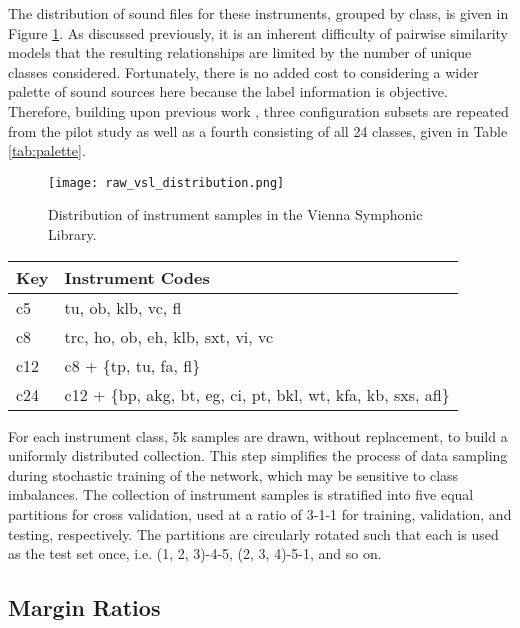 The distribution of sound files for these instruments, grouped by class, is given in Figure \ref{fig:c24_dist}.
As discussed previously, it is an inherent difficulty of pairwise similarity models that the resulting relationships are limited by the number of unique classes considered.
Fortunately, there is no added cost to considering a wider palette of sound sources here because the label information is objective.
Therefore, building upon previous work \cite{Humphrey2011Nonlinear}, three configuration subsets are repeated from the pilot study as well as a fourth consisting of all 24 classes, given in Table \ref{tab:palette}.

\begin{figure}[t]
\centering
\texttt{[image: raw\_vsl\_distribution.png]}
\caption{Distribution of instrument samples in the Vienna Symphonic Library.}
\label{fig:c24_dist}
\end{figure}


\begin{table*}[t]
\begin{center}
\caption{Instrument set configurations.}
\begin{tabular}{l | l }
Key & Instrument Codes \\
\hline
c5 & tu, ob, klb, vc, fl \\
c8 & trc, ho, ob, eh, klb, sxt, vi, vc \\
c12 & c8 + \{tp, tu, fa, fl\} \\
c24 & c12 + \{bp, akg, bt, eg, ci, pt, bkl, wt, kfa, kb, sxs, afl\} \\
\hline
\end{tabular}
\label{tab:palette}
\end{center}
\end{table*}

For each instrument class, 5k samples are drawn, without replacement, to build a uniformly distributed collection.
This step simplifies the process of data sampling during stochastic training of the network, which may be sensitive to class imbalances.
The collection of instrument samples is stratified into five equal partitions for cross validation, used at a ratio of 3-1-1 for training, validation, and testing, respectively.
The partitions are circularly rotated such that each is used as the test set once, i.e. (1, 2, 3)-4-5, (2, 3, 4)-5-1, and so on.


\subsection{Margin Ratios}

